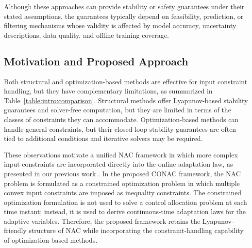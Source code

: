 \documentclass[letterpaper, journal]{IEEEtran}
\begin{document}
Although these approaches can provide stability or safety guarantees under their stated assumptions, the guarantees typically depend on feasibility, prediction, or filtering mechanisms whose validity is affected by model accuracy, uncertainty descriptions, data quality, and offline training coverage.


\subsection{Motivation and Proposed Approach}

Both structural and optimization-based methods are effective for input constraint handling, but they have complementary limitations, as summarized in Table~\ref{table:intro:comparison}.
Structural methods offer Lyapunov-based stability guarantees and solver-free computation, but they are limited in terms of the classes of constraints they can accommodate.
Optimization-based methods can handle general constraints, but their closed-loop stability guarantees are often tied to additional conditions and iterative solvers may be required.

These observations motivate a unified NAC framework in which more complex input constraints are incorporated directly into the online adaptation law, as presented in our previous work \cite{Ryu:2025aa}.
In the proposed CONAC framework, the NAC problem is formulated as a constrained optimization problem in which multiple convex input constraints are imposed as inequality constraints.
The constrained optimization formulation is not used to solve a control allocation problem at each time instant; instead, it is used to derive continuous-time adaptation laws for the adaptive variables.
Therefore, the proposed framework retains the Lyapunov-friendly structure of NAC while incorporating the constraint-handling capability of optimization-based methods.
\end{document}
